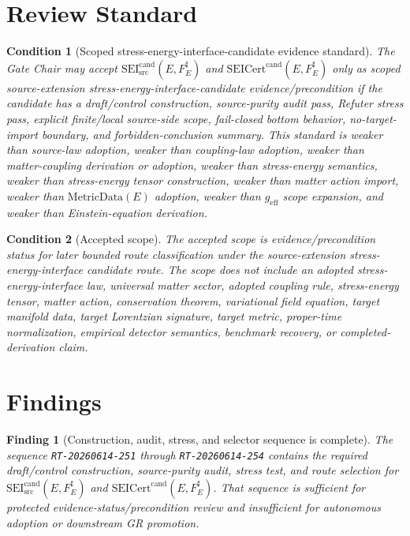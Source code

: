\documentclass[11pt]{article}
\newcommand{\MetricData}{\mathrm{MetricData}}
\newcommand{\geff}{g_{\mathrm{eff}}}
\newcommand{\SEICand}{\mathrm{SEI}_{\mathrm{src}}^{\mathrm{cand}}}
\newcommand{\SEICertCand}{\mathrm{SEICert}^{\mathrm{cand}}}
\newtheorem{finding}{Finding}
\newtheorem{condition}{Condition}
\begin{document}
\section{Review Standard}

\begin{condition}[Scoped stress-energy-interface-candidate evidence standard]
The Gate Chair may accept \(\SEICand(E,F_E^\sharp)\) and
\(\SEICertCand(E,F_E^\sharp)\) only as scoped source-extension
stress-energy-interface-candidate evidence/precondition if the candidate has
a draft/control construction, source-purity audit pass, Refuter stress pass,
explicit finite/local source-side scope, fail-closed bottom behavior,
no-target-import boundary, and forbidden-conclusion summary. This standard is
weaker than source-law adoption, weaker than coupling-law adoption, weaker
than matter-coupling derivation or adoption, weaker than stress-energy
semantics, weaker than stress-energy tensor construction, weaker than matter
action import, weaker than \(\MetricData(E)\) adoption, weaker than
\(\geff\) scope expansion, and weaker than Einstein-equation derivation.
\end{condition}

\begin{condition}[Accepted scope]
The accepted scope is evidence/precondition status for later bounded route
classification under the source-extension stress-energy-interface candidate
route. The scope does not include an adopted stress-energy-interface law,
universal matter sector, adopted coupling rule, stress-energy tensor, matter
action, conservation theorem, variational field equation, target manifold
data, target Lorentzian signature, target metric, proper-time normalization,
empirical detector semantics, benchmark recovery, or completed-derivation
claim.
\end{condition}

\section{Findings}

\begin{finding}[Construction, audit, stress, and selector sequence is complete]
The sequence \texttt{RT-20260614-251} through \texttt{RT-20260614-254}
contains the required draft/control construction, source-purity audit,
stress test, and route selection for \(\SEICand(E,F_E^\sharp)\) and
\(\SEICertCand(E,F_E^\sharp)\). That sequence is sufficient for protected
evidence-status/precondition review and insufficient for autonomous adoption
or downstream GR promotion.
\end{finding}
\end{document}
